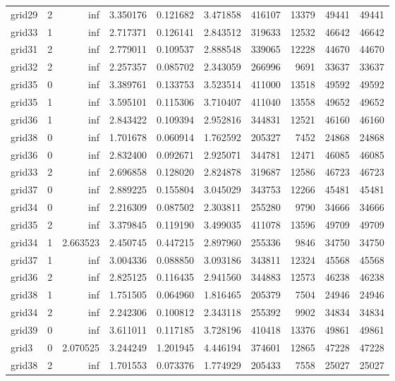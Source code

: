 \begin{longtable}{|l|r|r|r|r|r|r|r|r|r|}
grid29 & 2 & inf & 3.350176 & 0.121682 & 3.471858 & 416107 & 13379 & 49441 & 49441 \\
grid33 & 1 & inf & 2.717371 & 0.126141 & 2.843512 & 319633 & 12532 & 46642 & 46642 \\
grid31 & 2 & inf & 2.779011 & 0.109537 & 2.888548 & 339065 & 12228 & 44670 & 44670 \\
grid32 & 2 & inf & 2.257357 & 0.085702 & 2.343059 & 266996 & 9691 & 33637 & 33637 \\
grid35 & 0 & inf & 3.389761 & 0.133753 & 3.523514 & 411000 & 13518 & 49592 & 49592 \\
grid35 & 1 & inf & 3.595101 & 0.115306 & 3.710407 & 411040 & 13558 & 49652 & 49652 \\
grid36 & 1 & inf & 2.843422 & 0.109394 & 2.952816 & 344831 & 12521 & 46160 & 46160 \\
grid38 & 0 & inf & 1.701678 & 0.060914 & 1.762592 & 205327 & 7452 & 24868 & 24868 \\
grid36 & 0 & inf & 2.832400 & 0.092671 & 2.925071 & 344781 & 12471 & 46085 & 46085 \\
grid33 & 2 & inf & 2.696858 & 0.128020 & 2.824878 & 319687 & 12586 & 46723 & 46723 \\
grid37 & 0 & inf & 2.889225 & 0.155804 & 3.045029 & 343753 & 12266 & 45481 & 45481 \\
grid34 & 0 & inf & 2.216309 & 0.087502 & 2.303811 & 255280 & 9790 & 34666 & 34666 \\
grid35 & 2 & inf & 3.379845 & 0.119190 & 3.499035 & 411078 & 13596 & 49709 & 49709 \\
grid34 & 1 & 2.663523 & 2.450745 & 0.447215 & 2.897960 & 255336 & 9846 & 34750 & 34750 \\
grid37 & 1 & inf & 3.004336 & 0.088850 & 3.093186 & 343811 & 12324 & 45568 & 45568 \\
grid36 & 2 & inf & 2.825125 & 0.116435 & 2.941560 & 344883 & 12573 & 46238 & 46238 \\
grid38 & 1 & inf & 1.751505 & 0.064960 & 1.816465 & 205379 & 7504 & 24946 & 24946 \\
grid34 & 2 & inf & 2.242306 & 0.100812 & 2.343118 & 255392 & 9902 & 34834 & 34834 \\
grid39 & 0 & inf & 3.611011 & 0.117185 & 3.728196 & 410418 & 13376 & 49861 & 49861 \\
grid3 & 0 & 2.070525 & 3.244249 & 1.201945 & 4.446194 & 374601 & 12865 & 47228 & 47228 \\
grid38 & 2 & inf & 1.701553 & 0.073376 & 1.774929 & 205433 & 7558 & 25027 & 25027 \\

\end{longtable}

